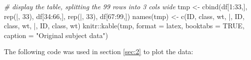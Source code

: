 \documentclass[smallextended]{svjour3}       %
\newenvironment{Shaded}{\begin{snugshade}}{\end{snugshade}}
\newcommand{\AttributeTok}[1]{\textcolor[rgb]{0.77,0.63,0.00}{#1}}
\newcommand{\CommentTok}[1]{\textcolor[rgb]{0.56,0.35,0.01}{\textit{#1}}}
\newcommand{\ConstantTok}[1]{\textcolor[rgb]{0.00,0.00,0.00}{#1}}
\newcommand{\DecValTok}[1]{\textcolor[rgb]{0.00,0.00,0.81}{#1}}
\newcommand{\FunctionTok}[1]{\textcolor[rgb]{0.00,0.00,0.00}{#1}}
\newcommand{\NormalTok}[1]{#1}
\newcommand{\OtherTok}[1]{\textcolor[rgb]{0.56,0.35,0.01}{#1}}
\newcommand{\SpecialCharTok}[1]{\textcolor[rgb]{0.00,0.00,0.00}{#1}}
\newcommand{\StringTok}[1]{\textcolor[rgb]{0.31,0.60,0.02}{#1}}
\begin{document}
\begin{Shaded}
\begin{Highlighting}[]
\CommentTok{\# display the table, splitting the 99 rows into 3 cols wide}
\NormalTok{tmp }\OtherTok{\textless{}{-}} \FunctionTok{cbind}\NormalTok{(df[}\DecValTok{1}\SpecialCharTok{:}\DecValTok{33}\NormalTok{,], }\FunctionTok{rep}\NormalTok{(}\StringTok{\textquotesingle{}|\textquotesingle{}}\NormalTok{, }\DecValTok{33}\NormalTok{), }
\NormalTok{             df[}\DecValTok{34}\SpecialCharTok{:}\DecValTok{66}\NormalTok{,], }\FunctionTok{rep}\NormalTok{(}\StringTok{\textquotesingle{}|\textquotesingle{}}\NormalTok{, }\DecValTok{33}\NormalTok{), }
\NormalTok{             df[}\DecValTok{67}\SpecialCharTok{:}\DecValTok{99}\NormalTok{,])}
\FunctionTok{names}\NormalTok{(tmp) }\OtherTok{\textless{}{-}} \FunctionTok{c}\NormalTok{(}\StringTok{\textquotesingle{}ID\textquotesingle{}}\NormalTok{, }\StringTok{\textquotesingle{}class\textquotesingle{}}\NormalTok{, }\StringTok{\textquotesingle{}wt\textquotesingle{}}\NormalTok{, }\StringTok{\textquotesingle{}|\textquotesingle{}}\NormalTok{, }\StringTok{\textquotesingle{}ID\textquotesingle{}}\NormalTok{, }\StringTok{\textquotesingle{}class\textquotesingle{}}\NormalTok{, }\StringTok{\textquotesingle{}wt\textquotesingle{}}\NormalTok{, }
                \StringTok{\textquotesingle{}|\textquotesingle{}}\NormalTok{, }\StringTok{\textquotesingle{}ID\textquotesingle{}}\NormalTok{, }\StringTok{\textquotesingle{}class\textquotesingle{}}\NormalTok{, }\StringTok{\textquotesingle{}wt\textquotesingle{}}\NormalTok{)}
\NormalTok{knitr}\SpecialCharTok{::}\FunctionTok{kable}\NormalTok{(tmp, }\AttributeTok{format =} \StringTok{\textquotesingle{}latex\textquotesingle{}}\NormalTok{, }\AttributeTok{booktabs =} \ConstantTok{TRUE}\NormalTok{, }
             \AttributeTok{caption =} \StringTok{"Original subject data"}\NormalTok{)}
\end{Highlighting}
\end{Shaded}

The following code was used in section \ref{sec:2} to plot the data:
\end{document}
